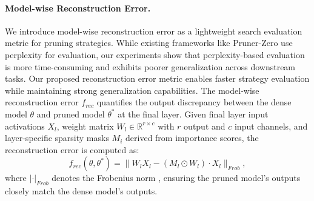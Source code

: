 \vspace{-0.5em}
\paragraph{Model-wise Reconstruction Error.}
We introduce model-wise reconstruction error as a lightweight search evaluation metric for pruning strategies. While existing frameworks like Pruner-Zero \citep{dongpruner} use perplexity for evaluation, our experiments show that perplexity-based evaluation is more time-consuming and exhibits poorer generalization across downstream tasks. Our proposed reconstruction error metric enables faster strategy evaluation while maintaining strong generalization capabilities.
The model-wise reconstruction error $f_{rec}$ quantifies the output discrepancy between the dense model $\theta$ and pruned model $\theta^*$ at the final layer. 
Given final layer input activations $X_{l}$, weight matrix $W_{l}\in \mathbb{R}^{r\times c}$ with $r$ output and $c$ input channels, and layer-specific sparsity masks ${M_{i}}$ derived from importance scores, the reconstruction error is computed as:
\begin{equation}
    f_{rec} (\theta, \theta^{*}) = \| W_{l}X_{l} - ({M}_{l} \odot W_{l})\cdot X_{l}\|_{Frob},
    \label{eq:norm}
\end{equation}
where $|\cdot|_{Frob}$ denotes the Frobenius norm \citep{golub1996matrix}, ensuring the pruned model's outputs closely match the dense model's outputs.


